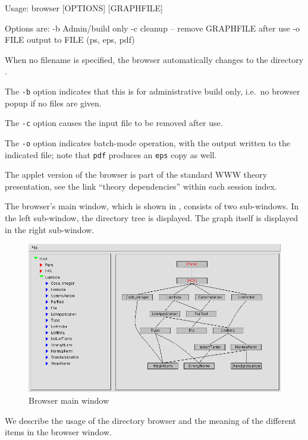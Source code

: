\begin{isabellebody}
\begin{isamarkuptext}
\begin{ttbox}
Usage: browser [OPTIONS] [GRAPHFILE]

  Options are:
    -b           Admin/build only
    -c           cleanup -- remove GRAPHFILE after use
    -o FILE      output to FILE (ps, eps, pdf)
\end{ttbox}
  When no filename is specified, the browser automatically changes to
  the directory \hyperlink{setting.ISABELLE-BROWSER-INFO}{\mbox{}}.

  \medskip The \verb|-b| option indicates that this is for
  administrative build only, i.e.\ no browser popup if no files are
  given.

  The \verb|-c| option causes the input file to be removed
  after use.

  The \verb|-o| option indicates batch-mode operation, with the
  output written to the indicated file; note that \verb|pdf|
  produces an \verb|eps| copy as well.

  \medskip The applet version of the browser is part of the standard
  WWW theory presentation, see the link ``theory dependencies'' within
  each session index.%
\end{isamarkuptext}%
\isamarkuptrue%
%
\isamarkuptrue%
%
\begin{isamarkuptext}%
The browser's main window, which is shown in
  , consists of two sub-windows.  In the
  left sub-window, the directory tree is displayed. The graph itself
  is displayed in the right sub-window.

  \begin{figure}[ht]
  \includegraphics[width=\textwidth]{browser_screenshot}
  \caption{\label{fig:browserwindow} Browser main window}
  \end{figure}%
\end{isamarkuptext}%
\isamarkuptrue%
%
\isamarkuptrue%
%
\begin{isamarkuptext}%
We describe the usage of the directory browser and the meaning of
  the different items in the browser window.


\end{isamarkuptext}
\end{isabellebody}
